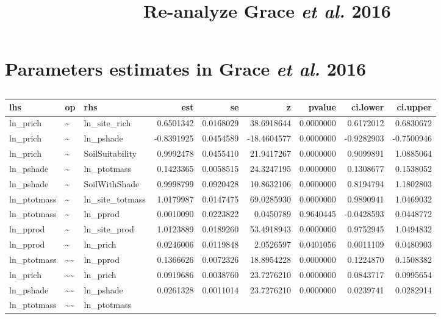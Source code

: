 \documentclass[ignorenonframetext,]{beamer}
\title{Re-analyze Grace \emph{et al.} 2016}
\date{}
\begin{document}
\frame{\titlepage}

\section{\texorpdfstring{Parameters estimates in Grace \emph{et al.}
2016}{Parameters estimates in Grace et al. 2016}}\label{parameters-estimates-in-grace-et-al.-2016}

\subsection{}\label{section}

\begin{frame}

\begin{longtable}[]{@{}lllrrrrrr@{}}
\toprule
lhs & op & rhs & est & se & z & pvalue & ci.lower &
ci.upper\tabularnewline
\midrule
\endhead
ln\_prich & \textasciitilde{} & ln\_site\_rich & 0.6501342 & 0.0168029 &
38.6918644 & 0.0000000 & 0.6172012 & 0.6830672\tabularnewline
ln\_prich & \textasciitilde{} & ln\_pshade & -0.8391925 & 0.0454589 &
-18.4604577 & 0.0000000 & -0.9282903 & -0.7500946\tabularnewline
ln\_prich & \textasciitilde{} & SoilSuitability & 0.9992478 & 0.0455410
& 21.9417267 & 0.0000000 & 0.9099891 & 1.0885064\tabularnewline
ln\_pshade & \textasciitilde{} & ln\_ptotmass & 0.1423365 & 0.0058515 &
24.3247195 & 0.0000000 & 0.1308677 & 0.1538052\tabularnewline
ln\_pshade & \textasciitilde{} & SoilWithShade & 0.9998799 & 0.0920428 &
10.8632106 & 0.0000000 & 0.8194794 & 1.1802803\tabularnewline
ln\_ptotmass & \textasciitilde{} & ln\_site\_totmass & 1.0179987 &
0.0147475 & 69.0285930 & 0.0000000 & 0.9890941 &
1.0469032\tabularnewline
ln\_ptotmass & \textasciitilde{} & ln\_pprod & 0.0010090 & 0.0223822 &
0.0450789 & 0.9640445 & -0.0428593 & 0.0448772\tabularnewline
ln\_pprod & \textasciitilde{} & ln\_site\_prod & 1.0123889 & 0.0189260 &
53.4918943 & 0.0000000 & 0.9752945 & 1.0494832\tabularnewline
ln\_pprod & \textasciitilde{} & ln\_prich & 0.0246006 & 0.0119848 &
2.0526597 & 0.0401056 & 0.0011109 & 0.0480903\tabularnewline
ln\_ptotmass & \textasciitilde{}\textasciitilde{} & ln\_pprod &
0.1366626 & 0.0072326 & 18.8954228 & 0.0000000 & 0.1224870 &
0.1508382\tabularnewline
ln\_prich & \textasciitilde{}\textasciitilde{} & ln\_prich & 0.0919686 &
0.0038760 & 23.7276210 & 0.0000000 & 0.0843717 &
0.0995654\tabularnewline
ln\_pshade & \textasciitilde{}\textasciitilde{} & ln\_pshade & 0.0261328
& 0.0011014 & 23.7276210 & 0.0000000 & 0.0239741 &
0.0282914\tabularnewline
ln\_ptotmass & \textasciitilde{}\textasciitilde{} & ln\_ptotmass &

\end{longtable}
\end{frame}
\end{document}
